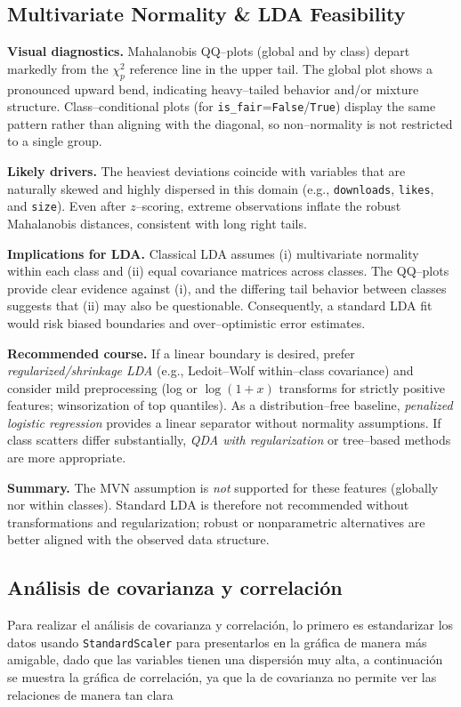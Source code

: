 \documentclass[journal]{IEEEtran}
\begin{document}
\subsection{Multivariate Normality \& LDA Feasibility}

\textbf{Visual diagnostics.} Mahalanobis QQ–plots (global and by class) depart markedly from the
$\chi^2_p$ reference line in the upper tail. The global plot shows a pronounced upward bend,
indicating heavy–tailed behavior and/or mixture structure. Class–conditional plots (for
\texttt{is\_fair}=\texttt{False}/\texttt{True}) display the same pattern rather than aligning with
the diagonal, so non–normality is not restricted to a single group.

\textbf{Likely drivers.} The heaviest deviations coincide with variables that are naturally
skewed and highly dispersed in this domain (e.g., \texttt{downloads}, \texttt{likes}, and
\texttt{size}). Even after $z$–scoring, extreme observations inflate the robust Mahalanobis
distances, consistent with long right tails.

\textbf{Implications for LDA.} Classical LDA assumes (i) multivariate normality within each
class and (ii) equal covariance matrices across classes. The QQ–plots provide clear evidence
against (i), and the differing tail behavior between classes suggests that (ii) may also be
questionable. Consequently, a standard LDA fit would risk biased boundaries and over–optimistic
error estimates.

\textbf{Recommended course.} If a linear boundary is desired, prefer \emph{regularized/shrinkage
	LDA} (e.g., Ledoit–Wolf within–class covariance) and consider mild preprocessing (log or
$\log(1+x)$ transforms for strictly positive features; winsorization of top quantiles). As a
distribution–free baseline, \emph{penalized logistic regression} provides a linear separator
without normality assumptions. If class scatters differ substantially, \emph{QDA with
	regularization} or tree–based methods are more appropriate.

\textbf{Summary.} The MVN assumption is \emph{not} supported for these features (globally nor
within classes). Standard LDA is therefore not recommended without transformations and
regularization; robust or nonparametric alternatives are better aligned with the observed data
structure.






	\subsection{Análisis de covarianza y correlación}
	Para realizar el análisis de covarianza y correlación, lo primero es estandarizar los datos usando \texttt{StandardScaler} para presentarlos en la gráfica de manera más amigable, dado que las variables tienen una dispersión muy alta, a continuación se muestra la gráfica de correlación, ya que la de covarianza no permite ver las relaciones de manera tan clara
\end{document}
